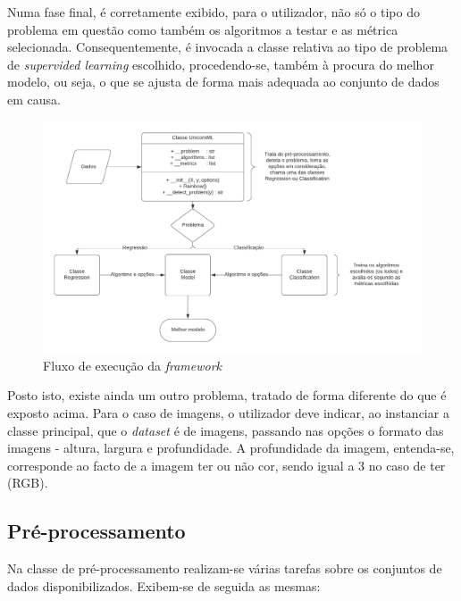 \documentclass[a4paper]{report}
\begin{document}
{		Numa fase final, é corretamente exibido, para o utilizador, não só o tipo do problema em questão como também os algoritmos a testar e as métrica selecionada.
		Consequentemente, é invocada a classe relativa ao tipo de problema de \textit{supervided learning} escolhido, procedendo-se, também à procura do melhor modelo, ou seja, o que se ajusta de forma mais adequada ao conjunto de dados em causa.

		\begin{figure}[H]
			\centering
			\includegraphics[width=1.0\textwidth]{Images/Diagram.png}
			\caption{Fluxo de execução da \textit{framework}}
			\label{fig:3}
		\end{figure}

		Posto isto, existe ainda um outro problema, tratado de forma diferente do que é exposto acima.
		Para o caso de imagens, o utilizador deve indicar, ao instanciar a classe principal, que o \textit{dataset} é de imagens, passando nas opções o formato das imagens - altura, largura e profundidade.
		A profundidade da imagem, entenda-se, corresponde ao facto de a imagem ter ou não cor, sendo igual a 3 no caso de ter (RGB).

		\subsection{Pré-processamento} \label{subsec:Pre-Processing}
		Na classe de pré-processamento realizam-se várias tarefas sobre os conjuntos de dados disponibilizados.
		Exibem-se de seguida as mesmas:

}
\end{document}
